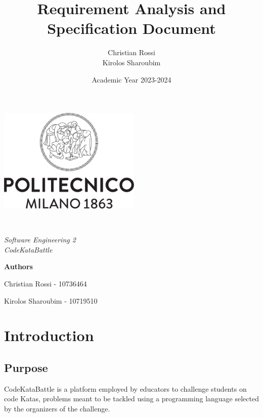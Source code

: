 \documentclass[12pt, a4paper]{report}
\title{Requirement Analysis and Specification Document}
\author{Christian Rossi \\ Kirolos Sharoubim}
\date{Academic Year 2023-2024}
\begin{document}
\begin{titlingpage} 
    \begin{center}
        \includegraphics[height=5cm]{images/polimi.png}\\
        \vspace{4cm}
        \begin{huge} 
            \textbf{\thetitle} \\
        \end{huge}
        \vspace{0.3cm}
        \begin{Large}
            \textit{Software Engineering 2 \\ CodeKataBattle} \\
        \end{Large}
    \end{center}
    \vspace{6.9cm}
        \begin{center}
            \textbf{Authors}

            Christian Rossi - 10736464

            Kirolos Sharoubim - 10719510
    \end{center}
\end{titlingpage}

\newpage

\tableofcontents

\newpage

\chapter{Introduction}
    \section{Purpose}
    CodeKataBattle is a platform employed by educators to challenge students on code Katas, problems meant to be tackled using a programming language selected by 
    the organizers of the challenge.
    
\end{document}
